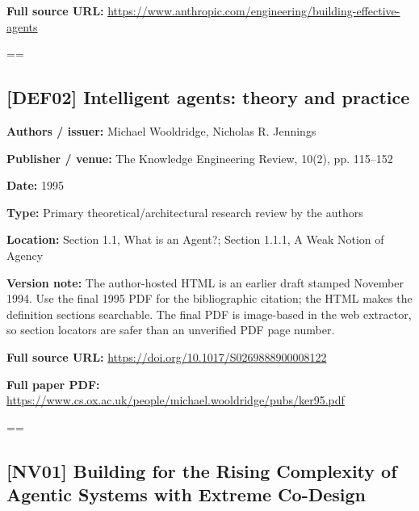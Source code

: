 \documentclass[10pt,letterpaper]{article}
\begin{document}
\textbf{Full source URL:} \href{https://www.anthropic.com/engineering/building-effective-agents}{\small\ttfamily https:/\allowbreak{}/\allowbreak{}www.\allowbreak{}anthropic.\allowbreak{}com/\allowbreak{}engineering/\allowbreak{}building-\allowbreak{}effective-\allowbreak{}agents}\par
\egroup\par\noindent\box\readingEntry\par\medskip
\setbox\readingEntry=\vbox\bgroup\hsize=\linewidth\subsection*{[DEF02] Intelligent agents: theory and practice}
\textbf{Authors / issuer:} Michael Wooldridge, Nicholas R. Jennings\par
\textbf{Publisher / venue:} The Knowledge Engineering Review, 10(2), pp. 115--152\par
\textbf{Date:} 1995\par
\textbf{Type:} Primary theoretical/architectural research review by the authors\par
\textbf{Location:} Section 1.1, What is an Agent?; Section 1.1.1, A Weak Notion of Agency\par
\textbf{Version note:} The author-hosted HTML is an earlier draft stamped November 1994. Use the final 1995 PDF for the bibliographic citation; the HTML makes the definition sections searchable. The final PDF is image-based in the web extractor, so section locators are safer than an unverified PDF page number.\par
\textbf{Full source URL:} \href{https://doi.org/10.1017/S0269888900008122}{\small\ttfamily https:/\allowbreak{}/\allowbreak{}doi.\allowbreak{}org/\allowbreak{}10.\allowbreak{}1017/\allowbreak{}S0269888900008122}\par
\textbf{Full paper PDF:} \href{https://www.cs.ox.ac.uk/people/michael.wooldridge/pubs/ker95.pdf}{\small\ttfamily https:/\allowbreak{}/\allowbreak{}www.\allowbreak{}cs.\allowbreak{}ox.\allowbreak{}ac.\allowbreak{}uk/\allowbreak{}people/\allowbreak{}michael.\allowbreak{}wooldridge/\allowbreak{}pubs/\allowbreak{}ker95.\allowbreak{}pdf}\par
\egroup\par\noindent\box\readingEntry\par\medskip
\setbox\readingEntry=\vbox\bgroup\hsize=\linewidth\subsection*{[NV01] Building for the Rising Complexity of Agentic Systems with Extreme Co-Design}
\end{document}
